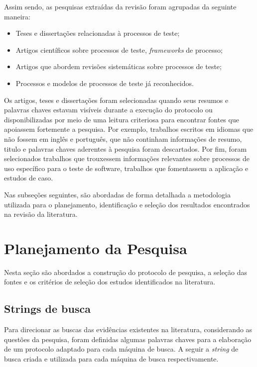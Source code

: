 Assim sendo, as pesquisas extraídas da revisão foram agrupadas da seguinte maneira:

\begin{itemize}
\item Teses e dissertações relacionadas à processos de teste;
\item Artigos científicos sobre processos de teste, \textit{frameworks} de processo;
\item Artigos que abordem revisões sistemáticas sobre processos de teste;
\item Processos e modelos de processos de teste já reconhecidos.
\end{itemize}

Os artigos, teses e dissertações foram selecionadas quando seus resumos e palavras chaves estavam visíveis durante a execução do protocolo ou disponibilizadas por meio de uma leitura criteriosa para encontrar fontes que apoiassem fortemente a pesquisa. Por exemplo, trabalhos escritos em idiomas que não fossem em inglês e português, que não continham informações de resumo, titulo e palavras chaves aderentes à pesquisa foram descartados. Por fim, foram selecionados trabalhos que trouxessem informações relevantes sobre processos de uso específico para o teste de software, trabalhos que fomentassem a aplicação e estudos de caso.

Nas subseções seguintes, são abordadas de forma detalhada a metodologia utilizada para o planejamento, identificação e seleção dos resultados encontrados na revisão da literatura.

\section{Planejamento da Pesquisa}
\label{sec:planejamentodapesquisa}

Nesta seção são abordados a construção do protocolo de pesquisa, a seleção das fontes e os critérios de seleção dos estudos identificados na literatura.

\subsection{Strings de busca}
\label{sec:stringdebusca}

Para direcionar as buscas das evidências existentes na literatura, considerando as questões da pesquisa, foram definidas algumas palavras chaves para a elaboração de um protocolo adaptado para cada máquina de busca. A seguir a \textit{string} de busca criada e utilizada para cada máquina de busca respectivamente.

